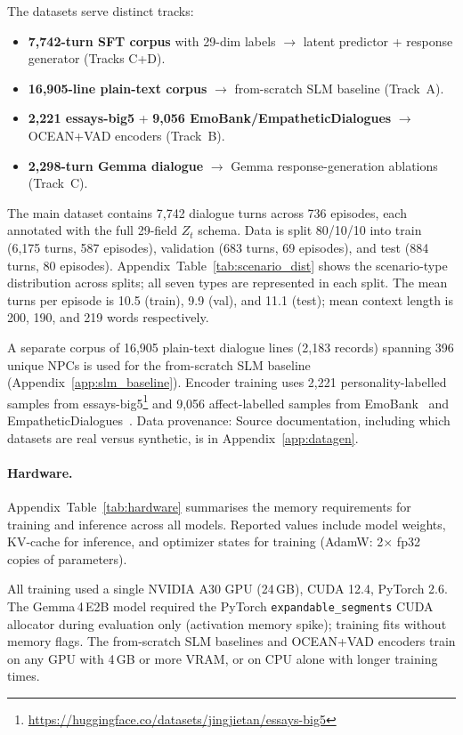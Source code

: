 \documentclass[11pt]{article}
\begin{document}
The datasets serve distinct tracks:
\begin{itemize}
    \item \textbf{7,742-turn SFT corpus} with 29-dim labels $\rightarrow$ latent predictor + response generator (Tracks C+D).
    \item \textbf{16,905-line plain-text corpus} $\rightarrow$ from-scratch SLM baseline (Track~A).
    \item \textbf{2,221 essays-big5} + \textbf{9,056 EmoBank/EmpatheticDialogues} $\rightarrow$ OCEAN+VAD encoders (Track~B).
    \item \textbf{2,298-turn Gemma dialogue} $\rightarrow$ Gemma response-generation ablations (Track~C).
\end{itemize}
The main dataset contains 7,742 dialogue turns across 736 episodes, each annotated with the full 29-field $Z_t$ schema.
Data is split 80/10/10 into train (6,175 turns, 587 episodes), validation (683 turns, 69 episodes), and test (884 turns, 80 episodes).
Appendix~Table~\ref{tab:scenario_dist} shows the scenario-type distribution across splits; all seven types are represented in each split.
The mean turns per episode is 10.5 (train), 9.9 (val), and 11.1 (test); mean context length is 200, 190, and 219 words respectively.

A separate corpus of 16,905 plain-text dialogue lines (2,183 records) spanning 396 unique NPCs is used for the from-scratch SLM baseline (Appendix~\ref{app:slm_baseline}).
Encoder training uses 2,221 personality-labelled samples from essays-big5\footnote{\url{https://huggingface.co/datasets/jingjietan/essays-big5}} and 9,056 affect-labelled samples from EmoBank~\cite{buechel2017emobank} and EmpatheticDialogues~\cite{rashkin2019empathetic}.
Data provenance: Source documentation, including which datasets are real versus synthetic, is in Appendix~\ref{app:datagen}.

\paragraph{Hardware.}
Appendix~Table~\ref{tab:hardware} summarises the memory requirements for training and inference across all models.
Reported values include model weights, KV-cache for inference, and optimizer states for training (AdamW: 2$\times$ fp32 copies of parameters).

All training used a single NVIDIA A30 GPU (24\,GB), CUDA 12.4, PyTorch 2.6.
The Gemma\,4\,E2B model required the PyTorch \texttt{expandable\_segments} CUDA allocator during evaluation only (activation memory spike); training fits without memory flags.
The from-scratch SLM baselines and OCEAN+VAD encoders train on any GPU with 4\,GB or more VRAM, or on CPU alone with longer training times.
\end{document}
